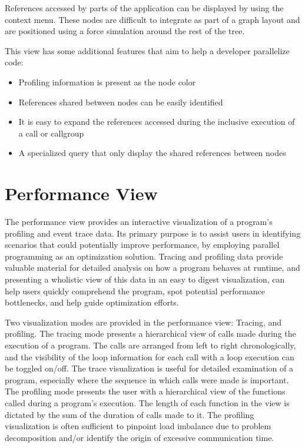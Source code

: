References accessed by parts of the application can be displayed by using the
context menu. These nodes are difficult to integrate as part of a graph layout
and are positioned using a force simulation around the rest of the tree.

This view has some additional features that aim to help a developer parallelize
code:

\begin{itemize}
	\item Profiling information is present as the node color
	\item References shared between nodes can be easily identified
	\item It is easy to expand the references accessed during the inclusive
execution of a call or callgroup
	\item A specialized query that only display the shared references between
nodes
\end{itemize}

\section{Performance View}
\label{sec:performance_view}
The performance view provides an interactive visualization of a program's
profiling and event trace data. Its primary purpose is to assist users in
identifying scenarios that could potentially improve performance, by employing
parallel programming as an optimization solution. Tracing and profiling data
provide valuable material for detailed analysis on how a program behaves at
runtime, and presenting a wholistic view of this data in an easy to digest
visualization, can help users quickly comprehend the program, spot potential
performance bottlenecks, and help guide optimization efforts.

Two visualization modes are provided in the performance view: Tracing, and
profiling. The tracing mode presents a hierarchical view of calls made during
the execution of a program. The calls are arranged from left to right
chronologically, and the visibility of the loop information for each call with
a loop execution can be toggled on/off. The trace visualization is useful for
detailed examination of a program, especially where the sequence in which
calls were made is important. The profiling mode presents the user with a
hierarchical view of the functions called during a program's execution. The
length of each function in the view is dictated by the sum of the duration of
calls made to it. The profiling visualization is often sufficient to pinpoint
load imbalance due to problem decomposition and/or identify the origin of
excessive communication time.


